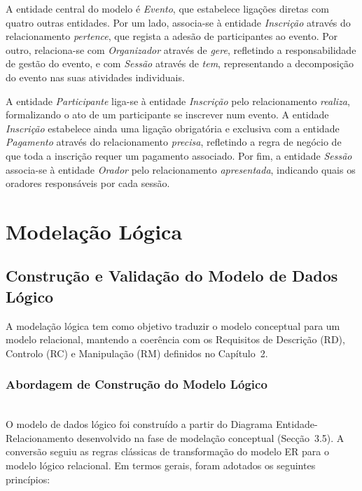 \documentclass[runningheads]{llncs}
\begin{document}
                    A entidade central do modelo é \textit{Evento}, que estabelece ligações diretas com 
                    quatro outras entidades. Por um lado, associa-se à entidade \textit{Inscrição} através 
                    do relacionamento \textit{pertence}, que regista a adesão de participantes ao evento. 
                    Por outro, relaciona-se com \textit{Organizador} através de \textit{gere}, refletindo 
                    a responsabilidade de gestão do evento, e com \textit{Sessão} através de \textit{tem}, 
                    representando a decomposição do evento nas suas atividades individuais.

                    A entidade \textit{Participante} liga-se à entidade \textit{Inscrição} pelo relacionamento 
                    \textit{realiza}, formalizando o ato de um participante se inscrever num evento. A entidade 
                    \textit{Inscrição} estabelece ainda uma ligação obrigatória e exclusiva com a entidade 
                    \textit{Pagamento} através do relacionamento \textit{precisa}, refletindo a regra de negócio 
                    de que toda a inscrição requer um pagamento associado. Por fim, a entidade \textit{Sessão} 
                    associa-se à entidade \textit{Orador} pelo relacionamento \textit{apresentada}, indicando 
                    quais os oradores responsáveis por cada sessão.


        \section{Modelação Lógica}

                \subsection{Construção e Validação do Modelo de Dados Lógico}

                A modelação lógica tem como objetivo traduzir o modelo conceptual para um
                modelo relacional, mantendo a coerência com os Requisitos de Descrição (RD),
                Controlo (RC) e Manipulação (RM) definidos no Capítulo~2.

                \subsubsection{Abordagem de Construção do Modelo Lógico}\mbox{}\\

                O modelo de dados lógico foi construído a partir do Diagrama Entidade-Relacionamento
                desenvolvido na fase de modelação conceptual (Secção~3.5). A conversão seguiu as
                regras clássicas de transformação do modelo ER para o modelo lógico relacional.
                Em termos gerais, foram adotados os seguintes princípios:
\end{document}

